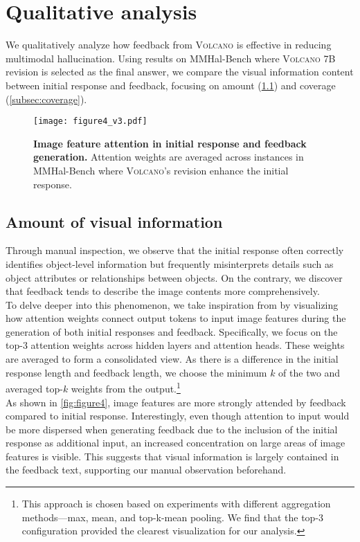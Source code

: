 \documentclass[11pt]{article}
\newcommand{\Ours}{\textsc{Volcano}}
\begin{document}
\section{Qualitative analysis}
\label{sec:qualitative}
We qualitatively analyze how feedback from {\Ours} is effective in reducing multimodal hallucination. Using results on MMHal-Bench where {\Ours} 7B revision is selected as the final answer, we compare the visual information content between initial response and feedback, focusing on amount (\ref{subsec:amount}) and coverage (\ref{subsec:coverage}). 
\begin{figure}[ht]
    \centering
    \texttt{[image: figure4\_v3.pdf]}
    \caption{\textbf{Image feature attention in initial response and feedback generation.} Attention weights are averaged across instances in MMHal-Bench where {\Ours}'s revision enhance the initial response.}
    \label{fig:figure4}
\end{figure}
\subsection{Amount of visual information}
\label{subsec:amount}
Through manual inspection, we observe that the initial response often correctly identifies object-level information but frequently misinterprets details such as object attributes or relationships between objects. On the contrary, we discover that feedback tends to describe the image contents more comprehensively. \\
To delve deeper into this phenomenon, we take inspiration from \citet{wang2023evaluation} by visualizing how attention weights connect output tokens to input image features during the generation of both initial responses and feedback. Specifically, we focus on the top-3 attention weights across hidden layers and attention heads. These weights are averaged to form a consolidated view. As there is a difference in the initial response length and feedback length, we choose the minimum $k$ of the two and averaged top-$k$ weights from the output.\footnote{This approach is chosen based on experiments with different aggregation methods---max, mean, and top-k-mean pooling. We find that the top-3 configuration provided the clearest visualization for our analysis.} \\
As shown in \autoref{fig:figure4}, image features are more strongly attended by feedback compared to initial response. Interestingly, even though attention to input would be more dispersed when generating feedback due to the inclusion of the initial response as additional input, an increased concentration on large areas of image features is visible. This suggests that visual information is largely contained in the feedback text, supporting our manual observation beforehand.
\end{document}
